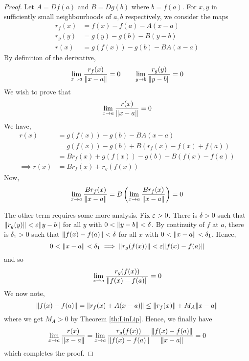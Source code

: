 \documentclass[../Analysis-3]{subfiles}
\begin{document}
\begin{proof}
  Let $ A = Df(a) $ and $ B = Dg(b) $ where $ b = f(a) $. For $ x,y $ in sufficiently small neighbourhoods of $ a,b $ respectively, we consider the maps
  \begin{align*}
    r_f(x) & = f(x) - f(a) - A(x-a)      \\
    r_g(y) & = g(y) - g(b) - B(y-b)      \\
    r(x)   & = g(f(x)) - g(b) - BA(x-a)
  \end{align*}
  By definition of the derivative,
  \[ \lim_{x \to a}\frac{r_f(x)}{\norm{x-a}}=0 \qquad \lim_{y \to b}\frac{r_g(y)}{\norm{y-b}}=0\]
  We wish to prove that
  \[ \lim_{x \to a}\frac{r(x)}{\norm{x-a}}=0 \]
  We have,
  \begin{align*}
    r(x)          & = g(f(x)) - g(b) - BA(x-a)                \\
                  & = g(f(x)) - g(b) + B(r_f(x) - f(x)+f(a))  \\
                  & = Br_f(x) + g(f(x)) - g(b) - B(f(x)-f(a)) \\
    \implies r(x) & = Br_f(x) + r_g(f(x))
  \end{align*}
  Now,
  \[ \lim_{x \to a}\frac{Br_f(x)}{\norm{x-a}} = B \left(\lim_{x \to a}\frac{Br_f(x)}{\norm{x-a}}\right) = 0 \]\ssk
  
  The other term requires some more analysis. Fix $ \varepsilon > 0 $. There is $ \delta > 0 $ such that $ \norm{r_g(y)} < \varepsilon \norm{y-b} $ for all $ y $ with $ 0 < \norm{y-b} < \delta $. By continuity of $ f $ at $ a $, there is $ \delta_1 > 0 $ such that $ \norm{f(x) - f(a)} < \delta $ for all $ x $ with $ 0 < \norm{x-a} < \delta_1 $. Hence,
  \[ 0 < \norm{x-a} < \delta_1 \implies \norm{r_g(f(x))} < \varepsilon\norm{f(x)-f(a)} \]
  and so
  \[ \lim_{x \to a}\frac{r_g(f(x))}{\norm{f(x)-f(a)}} = 0 \]
  We now note,
  \[ \norm{f(x)-f(a)} = \norm{r_f(x)+A(x-a)} \leq \norm{r_f(x)} + M_A\norm{x-a} \]
  where we get $ M_A > 0 $ by Theorem \ref{th:LinLip}. Hence, we finally have
  \[ \lim_{x \to a}\frac{r(x)}{\norm{x-a}} = \lim_{x \to a}\frac{r_g(f(x))}{\norm{f(x)-f(a)}} \frac{\norm{f(x)-f(a)}}{\norm{x-a}} = 0 \]
  which completes the proof.
  
\end{proof}
\end{document}
